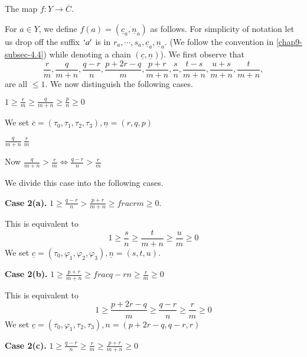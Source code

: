 \subsection{}\label{chap9-subsec-8.3}

The map $f : Y \rightarrow \overline{C}$.

For $a \in Y$, we define $f(a)= (\overline{\underline{c}_{a}, \underline{n}_{a}})$ as follows. For simplicity of notation let us drop off the suffix $`a'$ is in $r_{a}, \cdots , s_{a}, \underline{c}_{a}, \underline{n}_{a}$. (We follow the
convention in \ref{chap9-subsec-4.4}) while denoting a chain $(\underline{c}, \underline{n})$). We first observe that
$$
\frac{r}{m}, \frac{q}{m+n}, \frac{q-r}{n}, \frac{p+2r-q}{m}, \frac{p+r}{m+n}, \frac{s}{n}, \frac{t-s}{m+n}, \frac{u+s}{m+n}, \frac{t}{m+n},
$$ 
are all $\leq 1$. We now distinguish the following cases.

\setcounter{case}{0}
\begin{case}\label{chap9-subsec8.3-case-1}
$1 \geq \frac{r}{m} \geq\frac{q}{m+n} \geq \frac{p}{n} \geq 0$

We set $\overline{c}= (\tau_{0}, \tau_{1}, \tau_{2}, \tau_{3}),\underline{n} = (r,q,p)$
\end{case}

\begin{case}\label{chap9-subsec8.3-case-2}
$\frac{q}{m+n} \> \frac{r}{m}$

Now $\frac{q}{m+n} > \frac{r}{m} \Longleftrightarrow \frac{q-r}{n} > \frac{r}{m}$

We divide this case into the following cases.
\end{case}

\noindent
{\bf Case 2(a).}\label{chap9-subsec8.3-case-2(a)}
$ 1 \geq \frac{q-r}{n} > \frac{p+r}{m+n} \geq frac{r}{m} \geq 0$.

This is equivalent to
$$
1 \geq \frac{s}{n} \geq \frac{t}{m+n} \geq \frac{u}{m} \geq 0
$$
We set $\underline{c}= (\tau_{0},\varphi_{1}, \varphi_{2}, \varphi_{3}), \underline{n} = (s,t,u)$.

\medskip
\noindent
{\bf Case 2(b).} $ 1 \geq \frac{p+r}{m+n} \geq frac{q-r}{n} \geq \frac{r}{m} \geq 0$

This is equivalent to
$$
1 \geq \frac{p + 2r-q}{m} \geq \frac{q-r}{n} \geq \frac{r}{m} \geq 0
$$
We set $\underline{c} = (\tau_{0}, \varphi_{1}, \tau_{2}, \tau_{3}), n= (p+2r-q, q-r,r)$

\medskip
\noindent
{\bf  Case 2(c).} $1 \geq \frac{q-r}{n} \geq \frac{r}{m} \geq \frac{p+r}{m+n} \geq 0$\pageoriginale

